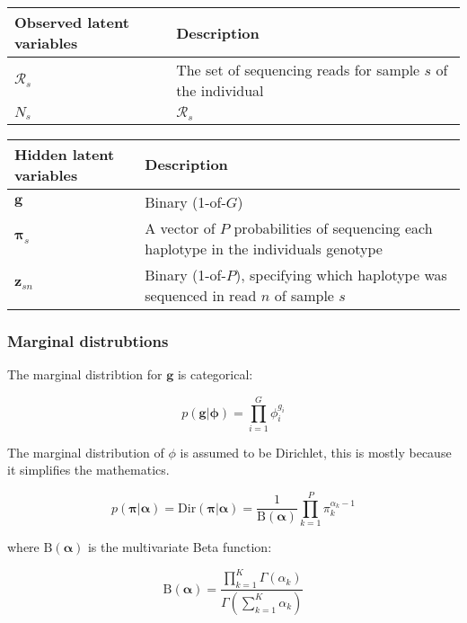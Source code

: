 \documentclass{article}
\begin{document}
\begin{center}
\begin{tabular}{ll}
Observed latent variables & Description \\
\hline
$\mathcal{R}_s$ & The set of sequencing reads for sample $s$ of the individual \\
$N_s$ & $\mathcal{R}_s$ \\
\hline
\end{tabular}
\end{center}

\begin{center}
\begin{tabular}{ll}
Hidden latent variables & Description \\
\hline
$\boldsymbol{g}$ & Binary (1-of-$G$) \\
$\boldsymbol{\pi}_s$ & A vector of $P$ probabilities of sequencing each haplotype in the individuals genotype \\
$\boldsymbol{z}_{sn}$ & Binary (1-of-$P$), specifying which haplotype was sequenced in read $n$ of sample $s$ \\
\hline
\end{tabular}
\end{center}

\subsubsection{Marginal distrubtions}

The marginal distribtion for $\boldsymbol{g}$ is categorical:

\begin{equation}
\label{eq:cnv_g_marginal}
    p(\boldsymbol{g} | \boldsymbol{\phi}) = \prod_{i = 1}^G \phi_i^{g_i}
\end{equation}

The marginal distribution of $\phi$ is assumed to be Dirichlet, this is mostly because it simplifies the mathematics.

\begin{equation}
\label{eq:cnv_pi_marginal}
    p(\boldsymbol{\pi} | \boldsymbol{\alpha}) = \text{Dir}(\boldsymbol{\pi} | \boldsymbol{\alpha}) = \frac{1}{\text{B}(\boldsymbol{\alpha})} \prod_{k = 1}^P \pi_k^{\alpha_k - 1}
\end{equation}

where $\text{B}(\boldsymbol{\alpha})$ is the multivariate Beta function:

\begin{equation}
\label{eq:beta_func}
    \text{B}(\boldsymbol{\alpha}) = \frac{\prod_{k = 1}^K \Gamma(\alpha_k)}{\Gamma(\sum_{k = 1}^K \alpha_k)}
\end{equation}
\end{document}
